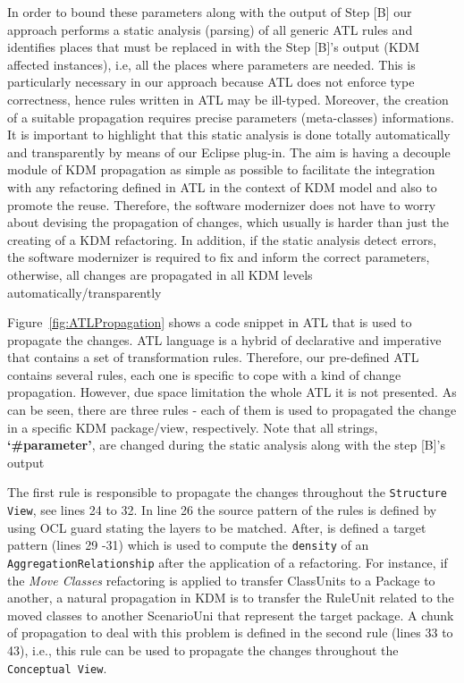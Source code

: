 In order to bound these parameters along with the output of Step [B] our approach performs a static analysis (parsing) of all generic ATL rules and identifies places that must be replaced in with the Step [B]'s output (KDM affected instances), i.e, all the places where parameters are needed. This is particularly necessary in our approach because ATL does not enforce type correctness, hence rules written in ATL may be ill-typed. Moreover, the creation of a suitable propagation %
requires precise parameters (meta-classes) informations. It is important to highlight that this static analysis is done totally automatically and transparently by means of our Eclipse plug-in. The aim is having a decouple module of KDM propagation as simple as possible to facilitate the integration with any refactoring defined in ATL in the context of KDM model and also to promote the reuse. Therefore, the software modernizer does not have to worry about devising the propagation of changes, which usually is harder than just the creating of a KDM refactoring. 
%
In addition, if the static analysis detect errors, the software modernizer is required to fix and inform the correct parameters, otherwise, all changes are propagated in all KDM levels automatically/transparently  


Figure~\ref{fig:ATLPropagation} shows a code snippet in ATL that is used to propagate the changes. ATL language is a hybrid of declarative and imperative that contains a set of transformation rules. Therefore, our pre-defined ATL contains several rules, each one is specific to cope with a kind of change propagation. However, due space limitation the whole ATL it is not presented. As can be seen, there are three rules - each of them is used to propagated the change in a specific KDM package/view, respectively. Note that all strings, \textbf{`\#parameter'}, are changed during the static analysis along with the step [B]'s output

The first rule is responsible to propagate the changes throughout the \texttt{Structure View}, see lines 24 to 32. In line 26 the source pattern of the rules is defined by using OCL guard stating the layers to be matched. After, is defined a target pattern (lines 29 -31) which is used to compute the \texttt{density} of an \texttt{AggregationRelationship} after the application of a refactoring. For instance, if the \textit{Move Classes} refactoring is applied to transfer ClassUnits to a Package to another, a natural propagation in KDM is to transfer the RuleUnit related to the moved classes to another ScenarioUni that represent the target package. A chunk of propagation to deal with this problem is defined in the second rule (lines 33 to 43), i.e., this rule can be used to propagate the changes throughout the \texttt{Conceptual View}.

